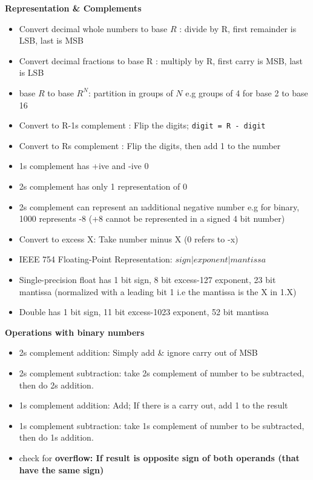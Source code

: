 \documentclass[a4paper]{article} \usepackage[backend=biber, style=numeric, sorting=none]{biblatex}
\begin{document}
\begin{multicols*}{4}
\textbf{Representation \& Complements}
\begin{itemize}[leftmargin=*]
\itemsep -0.5em
\item Convert decimal whole numbers to base $R$ : divide by R, first remainder is LSB, last is MSB
\item Convert decimal fractions to base R : multiply by R, first carry is MSB, last is LSB
\item base ${R}$ to base ${R^N}$: partition in groups of $N$ e.g groups of 4 for base 2 to base 16
\item Convert to R-1s complement : Flip the digits; \texttt{digit = R - digit}
\item Convert to Rs complement : Flip the digits, then add 1 to the number
\item 1s complement has +ive and -ive 0
\item 2s complement has only 1 representation of 0
\item 2s complement can represent an \i{additional} negative number e.g for binary, 1000 represents -8 (+8 cannot be represented in a signed 4 bit number)
\item Convert to excess X: Take number minus X (0 refers to -x)
\item IEEE 754 Floating-Point Representation:  $sign  | exponent  |  mantissa$
\item Single-precision float has 1 bit sign, 8 bit excess-127 exponent, 23 bit mantissa (normalized with a leading bit 1 i.e the mantissa is the X in 1.X)
\item Double has 1 bit sign, 11 bit excess-1023 exponent, 52 bit mantissa 
\end{itemize}

\textbf{Operations with binary numbers}
\begin{itemize}[leftmargin=*]
\itemsep -0.5em
\item 2s complement addition: Simply add \& ignore carry out of MSB
\item 2s complement subtraction: take 2s complement of number to be subtracted, then do 2s addition.
\item 1s complement addition: Add; If there is a carry out, add 1 to the result
\item 1s complement subtraction: take 1s complement of number to be subtracted, then do 1s addition.
\item check for \bf{overflow}: If result is opposite sign of both operands (that have the same sign)
\end{itemize}


\end{multicols*}
\end{document}
